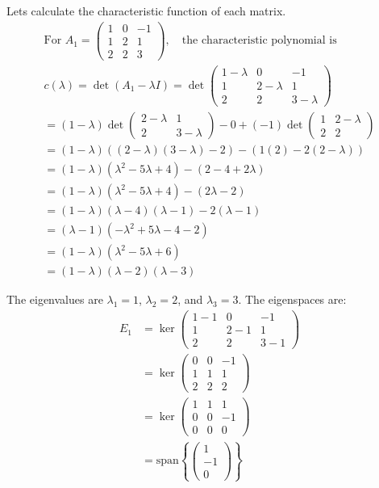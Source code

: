 \documentclass{article}
\begin{document}
Lets calculate the characteristic function of each matrix.
\begin{align*}
\text{For } A_1 = \begin{pmatrix}
1 & 0 & -1 \\
1 & 2 & 1 \\
2 & 2 & 3
\end{pmatrix}, \quad \text{the characteristic polynomial is } \\
c(\lambda) = \det(A_1 - \lambda I) = \det\begin{pmatrix}
1 - \lambda & 0 & -1 \\
1 & 2 - \lambda & 1 \\
2 & 2 & 3 - \lambda
\end{pmatrix} \\
= (1 - \lambda)\det\begin{pmatrix}
2 - \lambda & 1 \\
2 & 3 - \lambda
\end{pmatrix} - 0 + (-1)\det\begin{pmatrix}
1 & 2 - \lambda \\
2 & 2
\end{pmatrix} \\
= (1 - \lambda)((2 - \lambda)(3 - \lambda) - 2) - (1(2) - 2(2 - \lambda)) \\
= (1 - \lambda)(\lambda^2 - 5\lambda + 4) - (2 - 4 + 2\lambda) \\
= (1 - \lambda)(\lambda^2 - 5\lambda + 4) - (2\lambda - 2) \\
= (1 - \lambda)(\lambda - 4)(\lambda - 1) - 2(\lambda - 1) \\
= (\lambda - 1)(-\lambda^2 + 5\lambda - 4 - 2) \\
= (1 - \lambda)(\lambda^2 - 5\lambda + 6) \\
= (1 - \lambda)(\lambda - 2)(\lambda - 3)
\end{align*}

The eigenvalues are $\lambda_1 = 1$, $\lambda_2 = 2$, and $\lambda_3 = 3$.
The eigenspaces are:
\begin{align*}
E_1 &= \ker\begin{pmatrix}
1 - 1 & 0 & -1 \\
1 & 2 - 1 & 1 \\
2 & 2 & 3 - 1
\end{pmatrix} \\
&= \ker\begin{pmatrix}
0 & 0 & -1 \\
1 & 1 & 1 \\
2 & 2 & 2
\end{pmatrix} \\
&= \ker\begin{pmatrix}
1 & 1 & 1 \\
0 & 0 & -1 \\
0 & 0 & 0
\end{pmatrix} \\
&= \text{span}\left\{\begin{pmatrix}
1 \\
-1 \\
0
\end{pmatrix}\right\}
\end{align*}
\end{document}
